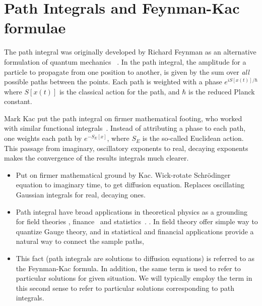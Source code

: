 \chapter{Path Integrals and Feynman-Kac formulae}


    The path integral was originally developed by Richard Feynman as an alternative formulation of quantum mechanics
    ~\cite{Feynman1948,Feynman1965}.  
    In the path integral, the amplitude for a particle to propagate from one position to another,
    is given by the sum over \emph{all} possible paths between the points.  
    Each path is weighted with a phase $e^{iS[x(t)]/\hbar}$ where $S[x(t)]$ is the classical action for the path,
    and $\hbar$ is the reduced Planck constant.  
    
    Mark Kac put the path integral on firmer mathematical footing, who worked with similar
    functional integrals~\cite{Kac1949}.  Instead of attributing a phase to each path, one weights each path
    by $e^{-S_E[x]}$, where $S_E$ is the so-called Euclidean action.  This passage from imaginary, oscillatory
    exponents to real, decaying exponents makes the convergence of the results integrals much clearer.

    
    


\begin{itemize}
  \item Put on firmer mathematical ground by Kac.  
    Wick-rotate Schr\"odinger equation to imaginary time, to get diffusion equation.
    Replaces oscillating Gaussian integrals for real, decaying ones.
  \item Path integral have broad applications in theoretical physics as a grounding for field theories
    \cite{Brown1994}, finance~\cite{Glasserman2004} and statistics~\cite{Durrett1996, Karatzas1991}.
    .
    In field theory offer simple way to quantize Gauge theory, and in statistical and financial 
    applications provide a natural way to connect the sample paths, 
  \item This fact (path integrals are solutions to diffusion equations) is referred to as the 
    Feynman-Kac formula.  
    In addition, the same term is used to refer to particular solutions for given situation.
    We will typically employ the term in this second sense to refer to particular
    solutions corresponding to path integrals.  
\end{itemize}

